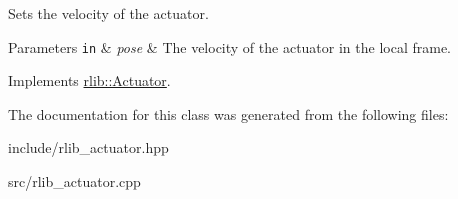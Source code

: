 Sets the velocity of the actuator. 


\begin{DoxyParams}[1]{Parameters}
\mbox{\tt in}  & {\em pose} & The velocity of the actuator in the local frame. \\
\hline
\end{DoxyParams}


Implements \hyperlink{classrlib_1_1Actuator_a8495e9dee469245fa6eba719b047cb3f}{rlib\-::\-Actuator}.



The documentation for this class was generated from the following files\-:\begin{DoxyCompactItemize}
\item 
include/rlib\-\_\-actuator.\-hpp\item 
src/rlib\-\_\-actuator.\-cpp\end{DoxyCompactItemize}
